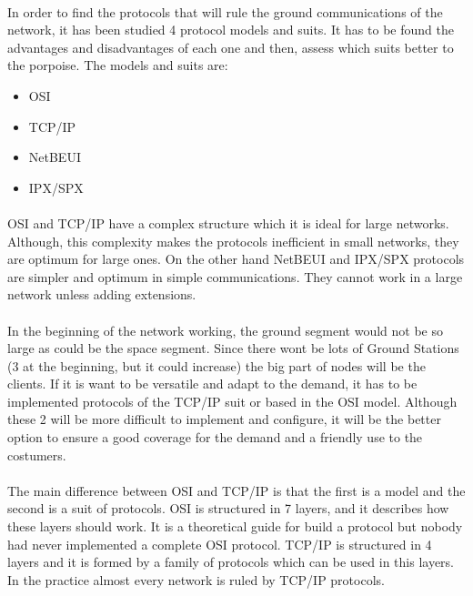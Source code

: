 \paragraph{}
In order to find the protocols that will rule the ground communications of the network, it has been studied 4 protocol models and suits. It has to be found the advantages and disadvantages of each one and then, assess which suits better to the porpoise. The models and suits are:
\begin{itemize}
\item OSI
\item TCP/IP
\item NetBEUI
\item IPX/SPX
\end{itemize}
\paragraph{} 
OSI and TCP/IP have a complex structure which it is ideal for large networks. Although, this complexity makes the protocols inefficient in small networks, they are optimum for large ones. On the other hand NetBEUI and IPX/SPX protocols are simpler and optimum in simple communications. They cannot work in a large network unless adding extensions. 
\paragraph{}
In the beginning of the network working, the ground segment would not be so large as could be the space segment. Since there wont be lots of Ground Stations (3 at the beginning, but it could increase) the big part of nodes will be the clients. If it is want to be versatile and adapt to the demand, it has to be implemented protocols of the TCP/IP suit or based in the OSI model. Although these 2 will be more difficult to implement and configure, it will be the better option to ensure a good coverage for the demand and a friendly use to the costumers.
\paragraph{}
The main difference between OSI and TCP/IP is that the first is a model and the second is a suit of protocols. OSI is structured in 7 layers, and it describes how these layers should work. It is a theoretical guide for build a protocol but nobody had never implemented a complete OSI protocol. TCP/IP is structured in 4 layers and it is formed by a family of protocols which can be used in this layers. In the practice almost every network is ruled by TCP/IP protocols. 
